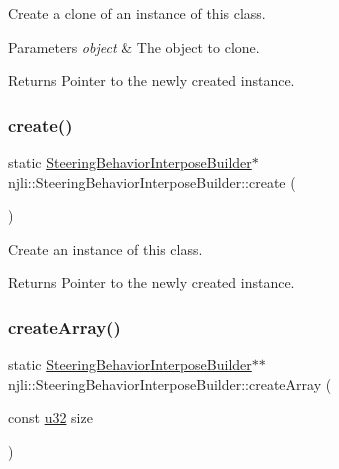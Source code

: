 Create a clone of an instance of this class.


\begin{DoxyParams}{Parameters}
{\em object} & The object to clone.\\
\hline
\end{DoxyParams}
\begin{DoxyReturn}{Returns}
Pointer to the newly created instance. 
\end{DoxyReturn}
\mbox{\label{classnjli_1_1_steering_behavior_interpose_builder_a4fe8d861e5eb67fc6c7f0367da73d2f8}} 
\subsubsection{\texorpdfstring{create()}{create()}}
{\footnotesize\ttfamily static \mbox{\hyperlink{classnjli_1_1_steering_behavior_interpose_builder}{Steering\+Behavior\+Interpose\+Builder}}$\ast$ njli\+::\+Steering\+Behavior\+Interpose\+Builder\+::create (\begin{DoxyParamCaption}{ }\end{DoxyParamCaption})\hspace{0.3cm}{\ttfamily [static]}}

Create an instance of this class.

\begin{DoxyReturn}{Returns}
Pointer to the newly created instance. 
\end{DoxyReturn}
\mbox{\label{classnjli_1_1_steering_behavior_interpose_builder_a497220c9d37e14cf1979d85abdf45d01}} 
\subsubsection{\texorpdfstring{create\+Array()}{createArray()}}
{\footnotesize\ttfamily static \mbox{\hyperlink{classnjli_1_1_steering_behavior_interpose_builder}{Steering\+Behavior\+Interpose\+Builder}}$\ast$$\ast$ njli\+::\+Steering\+Behavior\+Interpose\+Builder\+::create\+Array (\begin{DoxyParamCaption}\item[{const \mbox{\hyperlink{_util_8h_a10e94b422ef0c20dcdec20d31a1f5049}{u32}}}]{size }\end{DoxyParamCaption})\hspace{0.3cm}{\ttfamily [static]}}

